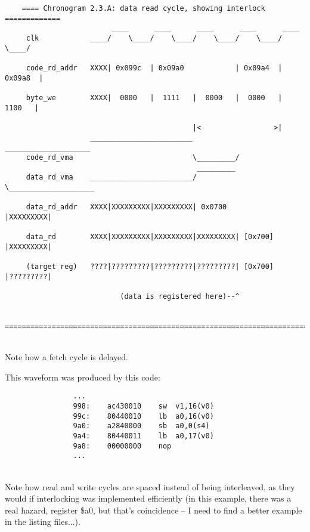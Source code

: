 \documentclass[11pt]{article}
\begin{document}
    
\begin{verbatim}
    ==== Chronogram 2.3.A: data read cycle, showing interlock =============
                         ____      ____      ____      ____      ____
     clk            ____/    \____/    \____/    \____/    \____/    \____/

     code_rd_addr   XXXX| 0x099c  | 0x09a0            | 0x09a4  | 0x09a8  |
     
     byte_we        XXXX|  0000   |  1111   |  0000   |  0000   |  1100   |
     
                                            |<                 >|
                    ________________________           ____________________
     code_rd_vma                            \_________/               
                                             _________                    
     data_rd_vma    ________________________/         \____________________

     data_rd_addr   XXXX|XXXXXXXXX|XXXXXXXXX| 0x0700            |XXXXXXXXX|

     data_rd        XXXX|XXXXXXXXX|XXXXXXXXX|XXXXXXXXX| [0x700] |XXXXXXXXX|

     (target reg)   ????|?????????|?????????|?????????| [0x700] |?????????|

                           (data is registered here)--^

    ========================================================================
\end{verbatim}\\

    Note how a fetch cycle is delayed.

    This waveform was produced by this code:

\begin{verbatim}    
                ...
                998:    ac430010    sw  v1,16(v0)
                99c:    80440010    lb  a0,16(v0)
                9a0:    a2840000    sb  a0,0(s4)
                9a4:    80440011    lb  a0,17(v0)
                9a8:    00000000    nop
                ...
\end{verbatim}\\

    Note how read and write cycles are spaced instead of being interleaved, as
    they would if interlocking was implemented efficiently (in this example, 
    there was a real hazard, register \$a0, but that's coincidence -- I need to
    find a better example in the listing files...).
    
\end{document}
